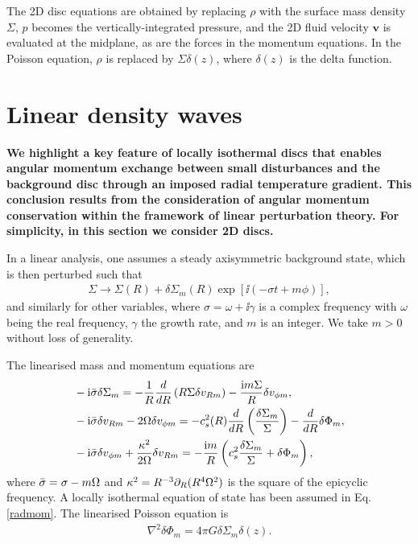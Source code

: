 The 2D disc equations are obtained by replacing $\rho$ with the surface
mass density $\Sigma$, $p$ becomes the vertically-integrated pressure, 
and the 2D fluid velocity $\bm{v}$ is evaluated at the midplane, as are
the forces in the momentum equations. In the Poisson equation, $\rho$ is
replaced by $\Sigma\delta(z)$, where $\delta(z)$ is the
delta function. 



\section{Linear density waves}\label{wkb}
{\bf We highlight a key feature of locally isothermal discs that
  enables angular momentum exchange between small disturbances and the
  background disc through an imposed radial temperature gradient. This
  conclusion results from the consideration of angular momentum
  conservation within the framework of linear perturbation theory. 
  For simplicity, in this section we consider 2D discs. 
}

In a linear analysis, one assumes a steady axisymmetric background state, %
which is then perturbed such that
\begin{align}  
  \Sigma \to \Sigma(R) + \delta\Sigma_m(R)\exp{\left[\ii\left(-\sigma t +
        m\phi\right)\right]}, 
\end{align}
and similarly for other variables, where $\sigma=\omega+\ii\gamma$ is
a complex frequency with $\omega$ being the real frequency, 
$\gamma$ the growth rate, and $m$ is an integer. We take $m>0$ without
loss of generality.  

The linearised mass and momentum equations are
\begin{align}
  &-\mathrm{i}\bar{\sigma} \delta\Sigma_m = -\frac{1}{R}\frac{d}{dR}\left(R\Sigma\delta
    v_{Rm}\right) - \frac{\mathrm{i} m \Sigma}{R}\delta v_{\phi m}, \\
  &-\mathrm{i}\bar{\sigma}\delta v_{Rm} - 2\Omega \delta v_{\phi m} = -
  c_s^2(R)\frac{d}{dR}\left(\frac{\delta\Sigma_m}{\Sigma}\right) - \frac{d}{dR}\delta\Phi_m,\label{radmom}\\
  & -\mathrm{i}\bar{\sigma}\delta v_{\phi m} + \frac{\kappa^2}{2\Omega}\delta v_{Rm} =
  -\frac{\mathrm{i} m }{R}\left(c_s^2\frac{\delta\Sigma_m}{\Sigma} + \delta\Phi_m\right),
\end{align}
where $\bar{\sigma} = \sigma - m\Omega$ and $\kappa^2 =
R^{-3}\partial_R(R^4\Omega^2)$ is the square of the epicyclic frequency. A
locally isothermal equation of state has been assumed in
Eq. \ref{radmom}.  The linearised Poisson equation is 
\begin{align}
  \nabla^2\delta\Phi_m = 4\pi G \delta\Sigma_m \delta(z). 
\end{align}

